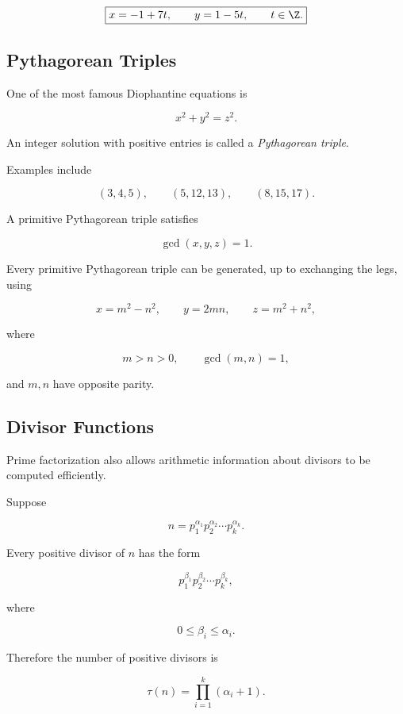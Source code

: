 \[ \boxed{x=-1+7t,\qquad y=1-5t,\qquad t\in\Z.} \]

\subsection{Pythagorean Triples}
\label{subsec:pythagorean-triples}

One of the most famous Diophantine equations is

\[ x^2+y^2=z^2. \]

An integer solution with positive entries is called a
\emph{Pythagorean triple}.

Examples include

\[ (3,4,5),\qquad(5,12,13),\qquad(8,15,17). \]

A primitive Pythagorean triple satisfies

\[ \gcd(x,y,z)=1. \]

Every primitive Pythagorean triple can be generated, up to exchanging the
legs, using

\[ x=m^2-n^2,\qquad y=2mn,\qquad z=m^2+n^2, \]

where

\[ m>n>0,\qquad \gcd(m,n)=1, \]

and \(m,n\) have opposite parity.

\subsection{Divisor Functions}
\label{subsec:divisor-functions}

Prime factorization also allows arithmetic information about divisors to be
computed efficiently.

Suppose

\[ n=p_1^{\alpha_1}p_2^{\alpha_2}\cdots p_k^{\alpha_k}. \]

Every positive divisor of \(n\) has the form

\[ p_1^{\beta_1}p_2^{\beta_2}\cdots p_k^{\beta_k}, \]

where

\[ 0\leq\beta_i\leq\alpha_i. \]

Therefore the number of positive divisors is

\[ \boxed{\tau(n)=\prod_{i=1}^{k}(\alpha_i+1).} \]

